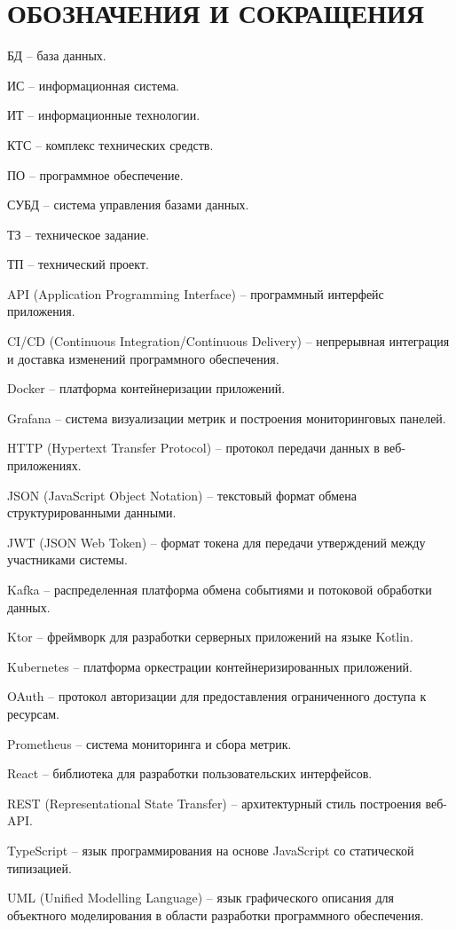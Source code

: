 \section*{ОБОЗНАЧЕНИЯ И СОКРАЩЕНИЯ}

БД -- база данных.

ИС -- информационная система.

ИТ -- информационные технологии. 

КТС -- комплекс технических средств.

ПО -- программное обеспечение.

СУБД -- система управления базами данных.

ТЗ -- техническое задание.

ТП -- технический проект.

API (Application Programming Interface) -- программный интерфейс приложения.

CI/CD (Continuous Integration/Continuous Delivery) -- непрерывная интеграция и доставка изменений программного обеспечения.

Docker -- платформа контейнеризации приложений.

Grafana -- система визуализации метрик и построения мониторинговых панелей.

HTTP (Hypertext Transfer Protocol) -- протокол передачи данных в веб-приложениях.

JSON (JavaScript Object Notation) -- текстовый формат обмена структурированными данными.

JWT (JSON Web Token) -- формат токена для передачи утверждений между участниками системы.

Kafka -- распределенная платформа обмена событиями и потоковой обработки данных.

Ktor -- фреймворк для разработки серверных приложений на языке Kotlin.

Kubernetes -- платформа оркестрации контейнеризированных приложений.

OAuth -- протокол авторизации для предоставления ограниченного доступа к ресурсам.

Prometheus -- система мониторинга и сбора метрик.

React -- библиотека для разработки пользовательских интерфейсов.

REST (Representational State Transfer) -- архитектурный стиль построения веб-API.

TypeScript -- язык программирования на основе JavaScript со статической типизацией.

UML (Unified Modelling Language) -- язык графического описания для объектного моделирования в области разработки программного обеспечения.
